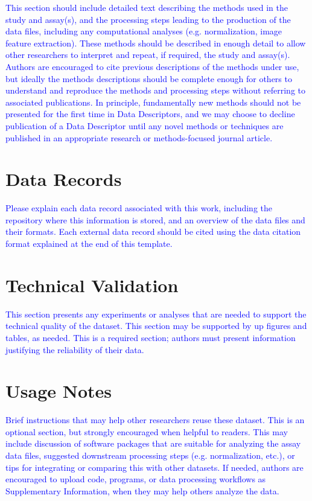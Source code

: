 \documentclass[english,11pt]{article}
\begin{document}
\textcolor{blue}{This section should include detailed text describing the methods used
in the study and assay(s), and the processing steps leading to the
production of the data files, including any computational analyses
(e.g. normalization, image feature extraction). These methods should
be described in enough detail to allow other researchers to interpret
and repeat, if required, the study and assay(s). Authors are encouraged
to cite previous descriptions of the methods under use, but ideally
the methods descriptions should be complete enough for others to understand
and reproduce the methods and processing steps without referring to
associated publications. In principle, fundamentally new methods should
not be presented for the first time in Data Descriptors, and we may
choose to decline publication of a Data Descriptor until any novel
methods or techniques are published in an appropriate research or
methods-focused journal article.}


\section*{Data Records }

\textcolor{blue}{Please explain each data record associated with this work, including
the repository where this information is stored, and an overview of
the data files and their formats. Each external data record should
be cited using the data citation format explained at the end of this
template.}


\section*{Technical Validation }

\textcolor{blue}{This section presents any experiments or analyses that are needed
to support the technical quality of the dataset. This section may
be supported by up figures and tables, as needed. This is a required
section; authors must present information justifying the reliability
of their data.}


\section*{Usage Notes}

\textcolor{blue}{Brief instructions that may help other researchers reuse these dataset.
This is an optional section, but strongly encouraged when helpful
to readers. This may include discussion of software packages that
are suitable for analyzing the assay data files, suggested downstream
processing steps (e.g. normalization, etc.), or tips for integrating
or comparing this with other datasets. If needed, authors are encouraged
to upload code, programs, or data processing workflows as Supplementary
Information, when they may help others analyze the data.}
\end{document}
